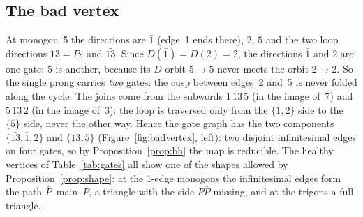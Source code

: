 \documentclass[12pt]{amsart}
\newcommand{\anti}[1]{\bar{#1}}          %
\newcommand{\Dg}{D}                       %
\newcommand{\per}{P}                      %
\newcommand{\set}[1]{\{#1\}}
\theoremstyle{plain}
\theoremstyle{definition}
\begin{document}
\subsection{The bad vertex}
At monogon~5 the directions are $\anti1$ (edge~1 ends there), $2$, $5$ and
the two loop directions $13=\per_5$ and $\anti{13}$.  Since $\Dg(\anti1) =
\Dg(2) = 2$, the directions $\anti1$ and $2$ are one gate; $5$ is another,
because its $\Dg$-orbit $5\to5$ never meets the orbit $2\to2$.  So the
single prong carries \emph{two} gates: the cusp between edges~2 and~5 is
never folded along the cycle.  The joins come from the subwords
$1\,\anti{13}\,5$ (in the image of~7) and $\anti5\,13\,2$ (in the image
of~3): the loop is traversed only from the $\set{\anti1,2}$ side to the
$\set5$ side, never the other way.  Hence the gate graph has the two
components $\set{\anti{13},\anti1,2}$ and $\set{13,5}$
(Figure~\ref{fig:badvertex}, left): two disjoint infinitesimal edges on
four gates, so by Proposition~\ref{prop:bh} the map is reducible.  The
healthy vertices of Table~\ref{tab:gates} all show one of the shapes
allowed by Proposition~\ref{prop:shape}: at the 1-edge monogons the
infinitesimal edges form the path $\anti\per$--main--$\per$, a triangle
with the side $\per\anti\per$ missing, and at the trigons a full
triangle.
\end{document}
